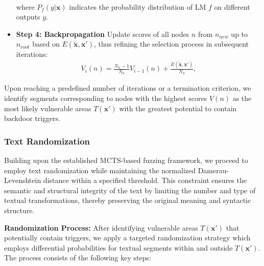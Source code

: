 \begin{itemize}[leftmargin=*]
\begin{equation}
\begin{aligned}
\end{aligned}
\label{eq: utility function}
\end{equation}
where $P_{f}(y|\mathbf{x})$ indicates the probability distribution of LM $f$ on different outputs $y$.
\item \textbf{Step 4: Backpropagation} Update scores of all nodes $n$ from $n_{new}$ up to $n_{root}$ based on $E(\tilde{\mathbf{x}}, \mathbf{x}')$, thus refining the selection process in subsequent iterations:
\begin{equation}
\begin{aligned}
V_{i}(n) = \frac{N_{n}-1}{N_{n}}V_{i-1}(n) + \frac{E(\tilde{\mathbf{x}}, \mathbf{x}')}{N_n},
\end{aligned}
\label{eq: value update}
\end{equation}

\end{itemize}
Upon reaching a predefined number of iterations or a termination criterion, we identify segments corresponding to nodes with the highest scores $V(n)$ as the most likely vulnerable areas $T(\mathbf{x}')$ with the greatest potential to contain backdoor triggers.

\subsubsection{Text Randomization}
Building upon the established MCTS-based fuzzing framework, we proceed to employ text randomization while maintaining the normalized Damerau-Levenshtein distance within a specified threshold. This constraint ensures the semantic and structural integrity of the text by limiting the number and type of textual transformations, thereby preserving the original meaning and syntactic structure.

\textbf{Randomization Process:} %
After identifying vulnerable areas $T(\mathbf{x}')$ that potentially contain triggers, we apply a targeted randomization strategy which employs differential probabilities for textual segments within and outside $T(\mathbf{x}')$. The process consists of the following key steps:

